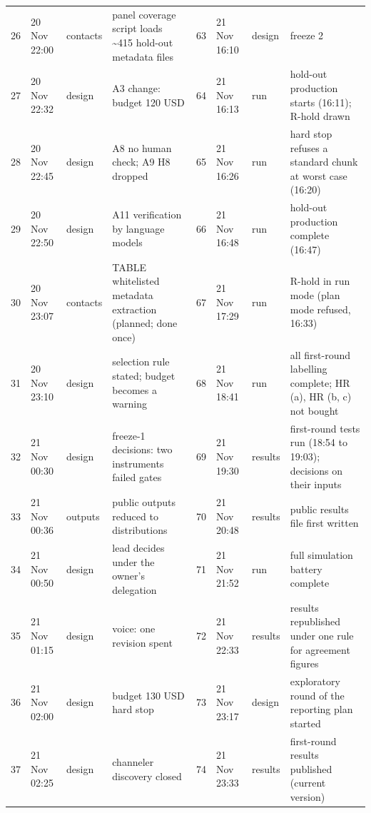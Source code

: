 {\begin{tabular}{@{}rllp{}rllp{}@{}}
26 & 20 Nov 22:00 & contacts & panel coverage script loads \textasciitilde{}415 hold-out metadata files & 63 & 21 Nov 16:10 & design & freeze 2 \\
27 & 20 Nov 22:32 & design & A3 change: budget 120 USD & 64 & 21 Nov 16:13 & run & hold-out production starts (16:11); R-hold drawn \\
28 & 20 Nov 22:45 & design & A8 no human check; A9 H8 dropped & 65 & 21 Nov 16:26 & run & hard stop refuses a standard chunk at worst case (16:20) \\
29 & 20 Nov 22:50 & design & A11 verification by language models & 66 & 21 Nov 16:48 & run & hold-out production complete (16:47) \\
30 & 20 Nov 23:07 & contacts & TABLE whitelisted metadata extraction (planned; done once) & 67 & 21 Nov 17:29 & run & R-hold in run mode (plan mode refused, 16:33) \\
31 & 20 Nov 23:10 & design & selection rule stated; budget becomes a warning & 68 & 21 Nov 18:41 & run & all first-round labelling complete; HR (a), HR (b, c) not bought \\
32 & 21 Nov 00:30 & design & freeze-1 decisions: two instruments failed gates & 69 & 21 Nov 19:30 & results & first-round tests run (18:54 to 19:03); decisions on their inputs \\
33 & 21 Nov 00:36 & outputs & public outputs reduced to distributions & 70 & 21 Nov 20:48 & results & public results file first written \\
34 & 21 Nov 00:50 & design & lead decides under the owner's delegation & 71 & 21 Nov 21:52 & run & full simulation battery complete \\
35 & 21 Nov 01:15 & design & voice: one revision spent & 72 & 21 Nov 22:33 & results & results republished under one rule for agreement figures \\
36 & 21 Nov 02:00 & design & budget 130 USD hard stop & 73 & 21 Nov 23:17 & design & exploratory round of the reporting plan started \\
37 & 21 Nov 02:25 & design & channeler discovery closed & 74 & 21 Nov 23:33 & results & first-round results published (current version) \\
\bottomrule
\end{tabular}}
